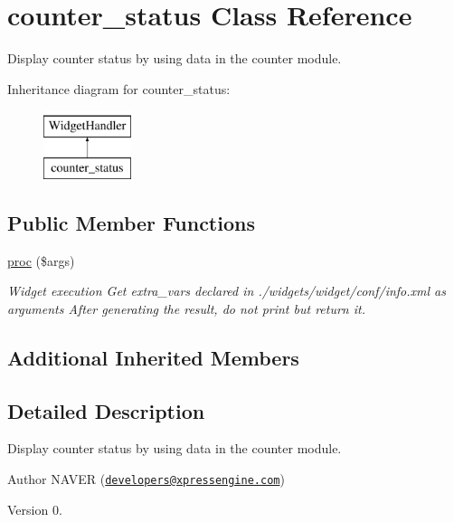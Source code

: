 \hypertarget{classcounter__status}{}\section{counter\+\_\+status Class Reference}
\label{classcounter__status}


Display counter status by using data in the counter module.  


Inheritance diagram for counter\+\_\+status\+:\begin{figure}[H]
\begin{center}
\leavevmode
\includegraphics[height=2.000000cm]{classcounter__status}
\end{center}
\end{figure}
\subsection*{Public Member Functions}
\begin{DoxyCompactItemize}
\item 
\hyperlink{classcounter__status_a46c561f1ad22adcd158d48d90e19588a}{proc} (\$args)
\begin{DoxyCompactList}\small\item\em Widget execution Get extra\+\_\+vars declared in ./widgets/widget/conf/info.xml as arguments After generating the result, do not print but return it. \end{DoxyCompactList}\end{DoxyCompactItemize}
\subsection*{Additional Inherited Members}


\subsection{Detailed Description}
Display counter status by using data in the counter module. 

\begin{DoxyAuthor}{Author}
N\+A\+V\+ER (\href{mailto:developers@xpressengine.com}{\tt developers@xpressengine.\+com}) 
\end{DoxyAuthor}
\begin{DoxyVersion}{Version}
0. 
\end{DoxyVersion}


